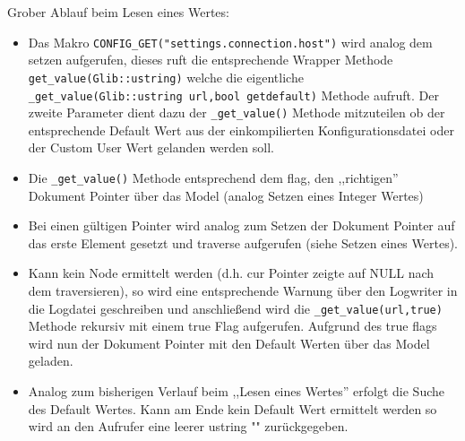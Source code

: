 Grober Ablauf beim Lesen eines Wertes:
\begin{itemize}


   \item Das Makro \verb+CONFIG_GET("settings.connection.host")+ wird analog dem setzen aufgerufen, dieses ruft die entsprechende Wrapper
   Methode \verb+get_value(Glib::ustring)+ welche die eigentliche \verb+_get_value(Glib::ustring url,bool getdefault)+ Methode aufruft.
   Der zweite Parameter dient dazu der \verb+_get_value()+ Methode mitzuteilen ob der entsprechende Default Wert aus der einkompilierten 
   Konfigurationsdatei oder der Custom User Wert gelanden werden soll.
   \item Die \verb+_get_value()+ Methode entsprechend dem flag, den ,,richtigen'' Dokument Pointer über das Model (analog Setzen eines Integer Wertes)
   \item Bei einen gültigen Pointer wird analog zum Setzen der Dokument Pointer auf das erste Element gesetzt und traverse
      aufgerufen (siehe Setzen eines Wertes).
   \item Kann kein Node ermittelt werden (d.h. cur Pointer zeigte auf NULL nach dem traversieren), so wird eine entsprechende Warnung über den
         Logwriter in die Logdatei geschreiben und anschließend wird die \verb+_get_value(url,true)+ Methode rekursiv mit einem true Flag aufgerufen.
         Aufgrund des true flags wird nun der Dokument Pointer mit den Default Werten über das Model geladen.
    \item Analog zum bisherigen Verlauf beim ,,Lesen eines Wertes'' erfolgt die Suche des Default Wertes. Kann am Ende kein
    Default Wert ermittelt werden so wird an den Aufrufer eine leerer ustring "" zurückgegeben.
\end{itemize}










